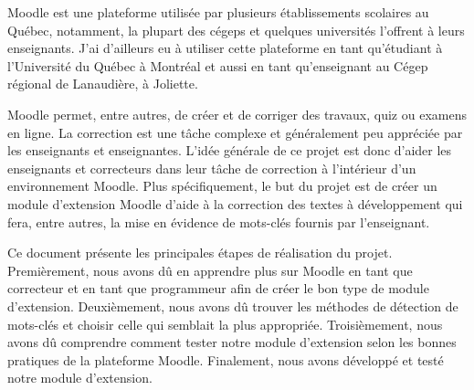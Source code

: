 \begin{introduction}

Moodle est une plateforme utilisée par plusieurs établissements scolaires au Québec, notamment, la plupart des cégeps et quelques universités l'offrent à leurs enseignants.
J'ai d'ailleurs eu à utiliser cette plateforme en tant qu'étudiant à l'Université du Québec à Montréal et aussi en tant qu'enseignant au Cégep régional de Lanaudière, à Joliette.

Moodle permet, entre autres, de créer et de corriger des travaux, quiz ou examens en ligne.
La correction est une tâche complexe et g\'en\'eralement peu appréciée par les enseignants et enseignantes.
L'idée générale de ce projet est donc d'aider les enseignants et correcteurs dans leur tâche de correction à l'intérieur d'un environnement Moodle.
Plus sp\'ecifiquement, le but du projet est de créer un module d'extension Moodle d'aide à la correction des textes à développement qui fera, entre autres, la mise en évidence de mots-clés fournis par l'enseignant.




Ce document pr\'esente les principales étapes de réalisation du projet.
Premièrement, nous avons d\^u en apprendre plus sur Moodle en tant que correcteur et en tant que programmeur afin de créer le bon type de module d'extension.
Deuxièmement, nous avons d\^u trouver les méthodes de détection de mots-clés et choisir celle qui semblait la plus appropri\'ee.
Troisièmement, nous avons d\^u comprendre comment tester notre module d'extension selon les bonnes pratiques de la plateforme Moodle.
Finalement, nous avons développ\'e et test\'e notre module d'extension.

\end{introduction}
